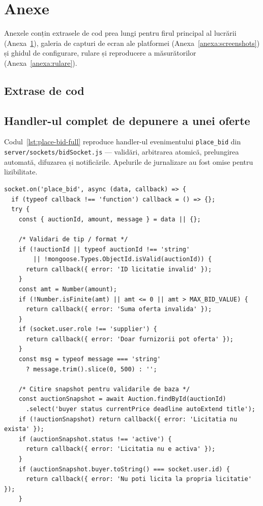 \chapter*{Anexe}

Anexele conțin extrasele de cod prea lungi pentru firul principal al lucrării (Anexa~\ref{anexa:cod}), galeria de capturi de ecran ale platformei (Anexa~\ref{anexa:screenshots}) și ghidul de configurare, rulare și reproducere a măsurătorilor (Anexa~\ref{anexa:rulare}).

\begin{appendices}

\chapter{Extrase de cod}
\label{anexa:cod}

\section{Handler-ul complet de depunere a unei oferte}

Codul~\ref{lst:place-bid-full} reproduce handler-ul evenimentului \texttt{place\_bid} din \texttt{server/sockets/bidSocket.js} --- validări, arbitrarea atomică, prelungirea automată, difuzarea și notificările. Apelurile de jurnalizare au fost omise pentru lizibilitate.

\begin{lstlisting}[caption={Handler-ul place\_bid (server/sockets/bidSocket.js, fără jurnalizare)},label={lst:place-bid-full}]
socket.on('place_bid', async (data, callback) => {
  if (typeof callback !== 'function') callback = () => {};
  try {
    const { auctionId, amount, message } = data || {};

    /* Validari de tip / format */
    if (!auctionId || typeof auctionId !== 'string'
        || !mongoose.Types.ObjectId.isValid(auctionId)) {
      return callback({ error: 'ID licitatie invalid' });
    }
    const amt = Number(amount);
    if (!Number.isFinite(amt) || amt <= 0 || amt > MAX_BID_VALUE) {
      return callback({ error: 'Suma oferta invalida' });
    }
    if (socket.user.role !== 'supplier') {
      return callback({ error: 'Doar furnizorii pot oferta' });
    }
    const msg = typeof message === 'string'
      ? message.trim().slice(0, 500) : '';

    /* Citire snapshot pentru validarile de baza */
    const auctionSnapshot = await Auction.findById(auctionId)
      .select('buyer status currentPrice deadline autoExtend title');
    if (!auctionSnapshot) return callback({ error: 'Licitatia nu exista' });
    if (auctionSnapshot.status !== 'active') {
      return callback({ error: 'Licitatia nu e activa' });
    }
    if (auctionSnapshot.buyer.toString() === socket.user.id) {
      return callback({ error: 'Nu poti licita la propria licitatie' });
    }


\end{lstlisting}
\end{appendices}
